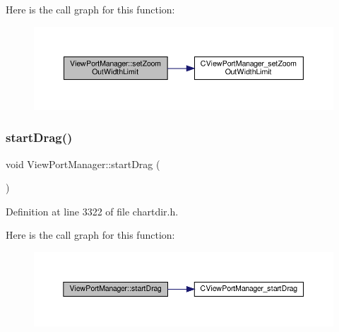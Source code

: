 Here is the call graph for this function\+:
\nopagebreak
\begin{figure}[H]
\begin{center}
\leavevmode
\includegraphics[width=350pt]{class_view_port_manager_a05ecf60e99e7ccbc9f84061485d07543_cgraph}
\end{center}
\end{figure}
\mbox{\label{class_view_port_manager_a2bfc533d7b307723e29ef03c45fb3237}} 
\subsubsection{\texorpdfstring{start\+Drag()}{startDrag()}}
{\footnotesize\ttfamily void View\+Port\+Manager\+::start\+Drag (\begin{DoxyParamCaption}{ }\end{DoxyParamCaption})\hspace{0.3cm}{\ttfamily [inline]}}



Definition at line 3322 of file chartdir.\+h.

Here is the call graph for this function\+:
\nopagebreak
\begin{figure}[H]
\begin{center}
\leavevmode
\includegraphics[width=350pt]{class_view_port_manager_a2bfc533d7b307723e29ef03c45fb3237_cgraph}
\end{center}
\end{figure}
\mbox{\label{class_view_port_manager_a7fe758aa316bfaee4bcbc9f28de8c3f0}} 
